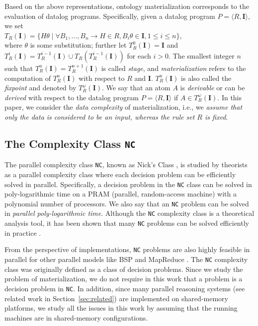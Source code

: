 Based on the above representations, ontology materialization
corresponds to the evaluation of datalog programs.
Specifically, given a datalog program $P=\langle R, \textbf{I}\rangle$,
we set\\[.5\baselineskip]
\mbox{}\hfill $T_R(\textbf{I})=\{H\theta \mid \forall B_1,\ldots,B_n\rightarrow H\in R,
B_i\theta\in\textbf{I}, 1\leq i\leq n \}$,\hfill\mbox{}\\[.5\baselineskip]
where $\theta$ is some substitution; further let $T_R^{0}(\textbf{I})=\textbf{I}$ and
 $T_R^{i}(\textbf{I})=T_R^{i-1}(\textbf{I})\cup T_R(T_R^{i-1}(\textbf{I}))$ for each $i>0$.
The smallest integer $n$ such that $T_R^{n}(\textbf{I})= T_R^{n+1}(\textbf{I})$ is called \emph{stage},
and \emph{materialization} refers to the computation of $T_R^{n}(\textbf{I})$ with respect to $R$ and \textbf{I}.
$T_R^{n}(\textbf{I})$ is also called the \emph{fixpoint} and denoted by $T_R^{\omega}(\textbf{I})$.
We say that an atom $A$ is \emph{derivable} or can be \emph{derived} with respect
to the datalog program $P=\langle R, \textbf{I}\rangle$ if $A\in T_R^{\omega}(\textbf{I})$.
In this paper, we consider the \emph{data complexity} of
materialization, i.e., we \emph{assume that only the data is
  considered to be an input, whereas the  rule set $R$ is fixed}.


\subsection{The Complexity Class \texttt{NC}}

The parallel complexity class \texttt{NC}, known as Nick's
Class \cite{Raymond95}, is studied by theorists as a parallel complexity class
where each decision problem can be efficiently solved in parallel.
Specifically, a decision problem in the \texttt{NC} class
can be solved in poly-logarithmic time on a PRAM (parallel, random-access machine) with
a polynomial number of processors. We also say that an \texttt{NC} problem can be solved
in \emph{parallel poly-logarithmic time}.
Although the \texttt{NC} complexity class is a theoretical analysis tool,
it has been shown that many \texttt{NC} problems can be solved efficiently in practice \cite{Raymond95}.

From the perspective of implementations, \texttt{NC} problems are also
highly feasible in parallel for other parallel models like BSP \cite{Valiant90}
and MapReduce \cite{KarloffSV10}. The \texttt{NC} complexity class was originally defined
as a class of decision problems. Since we study the problem of materialization, we do not
require in this work that a problem is a decision problem in \texttt{NC}.
In addition, since many parallel reasoning systems (see related work in Section~\ref{sec:related})
are implemented on shared-memory platforms, we
study all the issues in this work by assuming that the running machines are in
shared-memory configurations.



